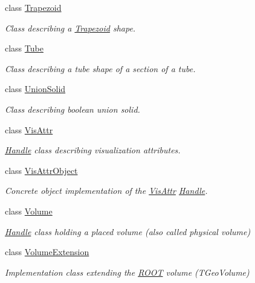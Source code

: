 \begin{DoxyCompactItemize}
class \hyperlink{class_d_d4hep_1_1_geometry_1_1_trapezoid}{Trapezoid}
\begin{DoxyCompactList}\small\item\em Class describing a \hyperlink{class_d_d4hep_1_1_geometry_1_1_trapezoid}{Trapezoid} shape. \end{DoxyCompactList}\item 
class \hyperlink{class_d_d4hep_1_1_geometry_1_1_tube}{Tube}
\begin{DoxyCompactList}\small\item\em Class describing a tube shape of a section of a tube. \end{DoxyCompactList}\item 
class \hyperlink{class_d_d4hep_1_1_geometry_1_1_union_solid}{Union\+Solid}
\begin{DoxyCompactList}\small\item\em Class describing boolean union solid. \end{DoxyCompactList}\item 
class \hyperlink{class_d_d4hep_1_1_geometry_1_1_vis_attr}{Vis\+Attr}
\begin{DoxyCompactList}\small\item\em \hyperlink{class_d_d4hep_1_1_handle}{Handle} class describing visualization attributes. \end{DoxyCompactList}\item 
class \hyperlink{class_d_d4hep_1_1_geometry_1_1_vis_attr_object}{Vis\+Attr\+Object}
\begin{DoxyCompactList}\small\item\em Concrete object implementation of the \hyperlink{class_d_d4hep_1_1_geometry_1_1_vis_attr}{Vis\+Attr} \hyperlink{class_d_d4hep_1_1_handle}{Handle}. \end{DoxyCompactList}\item 
class \hyperlink{class_d_d4hep_1_1_geometry_1_1_volume}{Volume}
\begin{DoxyCompactList}\small\item\em \hyperlink{class_d_d4hep_1_1_handle}{Handle} class holding a placed volume (also called physical volume) \end{DoxyCompactList}\item 
class \hyperlink{class_d_d4hep_1_1_geometry_1_1_volume_extension}{Volume\+Extension}
\begin{DoxyCompactList}\small\item\em Implementation class extending the \hyperlink{namespace_r_o_o_t}{R\+O\+OT} volume (T\+Geo\+Volume) \end{DoxyCompactList}\item 

\end{DoxyCompactItemize}
